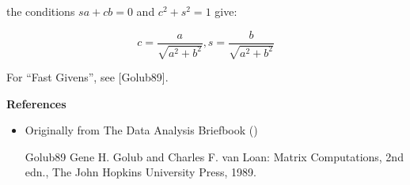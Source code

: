 \documentclass[12pt]{article}
\begin{document}
the conditions $sa + cb = 0$ and $c^2 + s^2 = 1$ give:

$$ c = \frac{a}{\sqrt{a^2+b^2}} , s = \frac{b}{\sqrt{a^2+b^2}} $$

For ``Fast Givens'', see [Golub89].

{\bf References}

\begin{itemize}
\item Originally from The Data Analysis Briefbook
()
\end{itemize} 

\begin{itemize}
\item[Golub89] Gene H. Golub and Charles F. van Loan: Matrix Computations, 2nd edn., The John Hopkins University Press, 1989.
\end{itemize}
\end{document}
